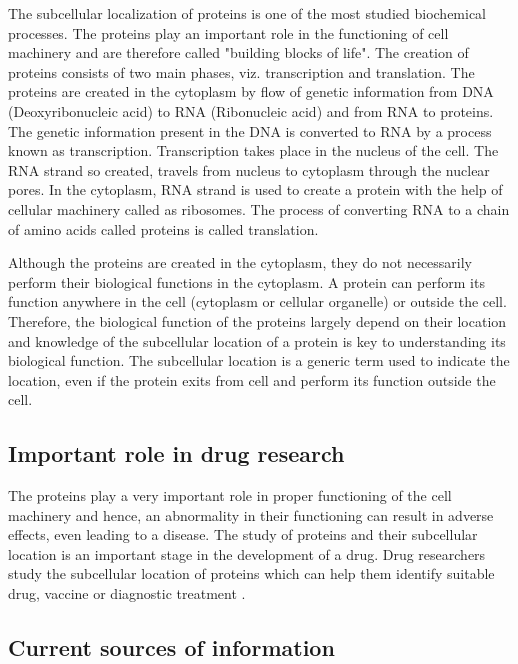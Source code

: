 The subcellular localization of proteins is one of the most studied biochemical processes. The proteins play an important role in the functioning of cell machinery and are therefore called "building blocks of life". The creation of proteins consists of two main phases, viz. transcription and translation. The proteins are created in the cytoplasm by flow of genetic information from DNA (Deoxyribonucleic acid) to RNA (Ribonucleic acid) and from RNA to proteins. The genetic information present in the DNA is converted to RNA by a process known as transcription. Transcription takes place in the nucleus of the cell. The RNA strand so created, travels from nucleus to cytoplasm through the nuclear pores. In the cytoplasm, RNA strand is used to create a protein with the help of cellular machinery called as ribosomes. The process of converting RNA to a chain of amino acids called proteins is called translation. 

Although the proteins are created in the cytoplasm, they do not necessarily perform their biological functions in the cytoplasm. A protein can perform its function anywhere in the cell (cytoplasm or cellular organelle) or outside the  cell. Therefore, the biological function of the proteins largely depend on their location and knowledge of the subcellular location of a protein is key to understanding its biological function. The subcellular location is a generic term used to indicate the location, even if the protein exits from cell and perform its  function outside the cell.

\subsection{Important role in drug research}

The proteins play a very important role in proper functioning of the cell machinery and hence, an abnormality in their functioning can result in adverse effects, even leading to a disease. The study of proteins and their subcellular location is an important stage in the development of a drug. Drug researchers study the subcellular location of proteins which can help them identify suitable drug, vaccine or diagnostic treatment \cite{liu2007exploiting}. 


\subsection{Current sources of information}

